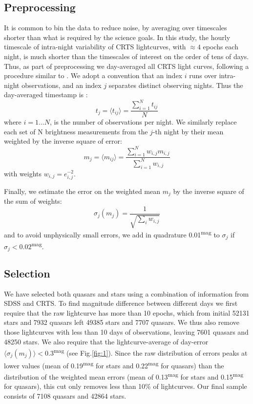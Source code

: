 \documentclass[fleqn,usenatbib]{mnras}  %
\begin{document}
\subsection{Preprocessing}
\label{sec:preprocessing}
It is common to bin the data to reduce noise, by averaging over timescales shorter than what is required by the science goals. In this study, the hourly timescale of intra-night variability of CRTS lightcurves, with $\approx 4$ epochs each night, is much shorter than the timescales of interest on the order of tens of days.  Thus, as part of preprocessing we day-averaged all  CRTS light curves, following a procedure similar to \cite{charisi2016}. We adopt a convention that an index  $i$ runs over intra-night observations, and an index $j$ separates distinct observing nights. Thus the day-averaged timestamp is : 
\begin{equation}
t_{j} = \langle t_{ij} \rangle = \frac{\sum_{i=1}^{N}{ t_{ij} }} {N} 
\end{equation}
where $i=1...N$, is the number of observations per night. We similarly replace each set of N brightness measurements from the  $j$-th  night by their mean weighted by the inverse square of error:
\begin{equation}
\label{eq:1}
 m_{j} = \langle m_{ij} \rangle = \frac{\sum_{i=1}^{N} {w_{i,j} m_{i,j}} } {\sum_{i=1}^{N} {w_{i,j}} }
\end{equation}
with weights $w_{i,j} = e_{i,j}^{-2}$.  

Finally, we estimate the error on the weighted mean $m_{j}$ by the inverse square of the sum of weights:  
\begin{equation}
\label{eq:2}
\sigma_{j}(m_{j}) = \frac{1}{\sqrt{\sum_{i}{w_{i,j}}}}
\end{equation} and to avoid unphysically small errors, we add in quadrature 0.01\textsuperscript{mag}  to $\sigma_{j}$ if $\sigma_{j} < 0.02$\textsuperscript{mag}. 


\subsection{Selection}
We have selected both quasars and stars using a combination of information from SDSS and CRTS. To find magnitude difference between different days we first require that the raw lightcurve has more than 10 epochs, which from initial 52131 stars and 7932 quasars left 49385 stars and 7707 quasars. We thus also remove those lightcurves with less than 10 days of observations, leaving 7601 quasars and 48250 stars.  We also require that the lightcurve-average of day-error $\langle \sigma_{j}(m_{j}) \rangle < 0.3$\textsuperscript{mag} (see Fig.\ref{fig:1}). Since the raw distribution of errors peaks at lower values (mean of 0.19\textsuperscript{mag} for stars and 0.22\textsuperscript{mag} for quasars) than the distribution of the weighted mean errors (mean of 0.13\textsuperscript{mag} for stars and 0.15\textsuperscript{mag} for quasars), this cut only removes less than 10\% of lightcurves. Our final sample consists of 7108 quasars and 42864 stars.
\end{document}
